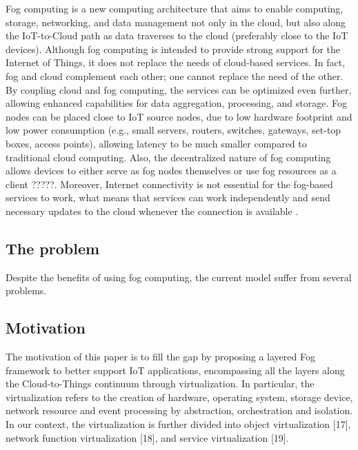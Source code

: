 \noindent\tab Fog computing is a new computing architecture that aims to enable computing, storage, networking, and data management not only in the cloud, but also along the IoT-to-Cloud path as data traverses to the cloud (preferably close to the IoT devices).
Although fog computing is intended to provide strong support for the Internet of Things, it does not replace the needs of cloud-based services. In fact, fog and cloud complement each other; one cannot replace the need of the other. By coupling cloud and fog computing, the services can be optimized even further, allowing enhanced capabilities for data aggregation, processing, and storage. Fog nodes can be placed close to IoT source nodes, due to low hardware footprint and low power consumption (e.g., small servers, routers, switches, gateways, set-top boxes, access points), allowing latency to be much smaller compared to traditional cloud computing. Also, the decentralized nature of fog computing allows devices to either serve as fog nodes themselves or use fog resources as a client ?????. Moreover, Internet connectivity is not essential for the fog-based services to work, what means that services can work independently and send necessary updates to the cloud whenever the connection is available \cite{yousefpour2018all}.

\subsection{The problem}
\noindent\tab Despite the benefits of using fog computing, the current model suffer from several problems. \cite{Armbrust:10} \\

\subsection{Motivation}
The motivation of this paper is to fill the gap by proposing
a layered Fog framework to better support IoT applications,
encompassing all the layers along the Cloud-to-Things continuum
through virtualization. In particular, the virtualization
refers to the creation of hardware, operating system, storage
device, network resource and event processing by abstraction,
orchestration and isolation. In our context, the virtualization is
further divided into object virtualization [17], network function
virtualization [18], and service virtualization [19].

